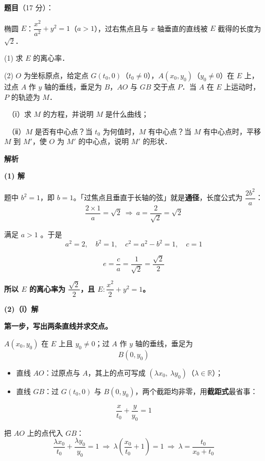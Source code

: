 \begin{answer}

\textbf{题目}（17 分）：

椭圆 $E$：$\dfrac{x^2}{a^2}+y^2=1$（$a>1$），过右焦点且与 $x$ 轴垂直的直线被 $E$ 截得的长度为 $\sqrt{2}$．

  (1) 求 $E$ 的离心率．

  (2) $O$ 为坐标原点，给定点 $G(t_0,0)$（$t_0\ne0$），$A(x_0,y_0)$（$y_0\ne0$）在 $E$ 上，过点 $A$ 作 $y$ 轴的垂线，垂足为 $B$，$AO$ 与 $GB$ 交于点 $P$．当 $A$ 在 $E$ 上运动时，$P$ 的轨迹为 $M$．

  　（ⅰ）求 $M$ 的方程，并说明 $M$ 是什么曲线；

  　（ⅱ）$M$ 是否有中心点？当 $t_0$ 为何值时，$M$ 有中心点？当 $M$ 有中心点时，平移 $M$ 到 $M'$，使 $O$ 为 $M'$ 的中心点，说明 $M'$ 的形状．

\textbf{解析}

\par\medskip

\textbf{(1) 解}

题中 $b^2=1$，即 $b=1$。「过焦点且垂直于长轴的弦」就是\textbf{通径}，长度公式为 $\dfrac{2b^2}{a}$：
\nopagebreak[4]
\[\frac{2\times1}{a}=\sqrt2\ \Longrightarrow\ a=\frac{2}{\sqrt2}=\sqrt2\]

满足 $a>1$ 。于是
\nopagebreak[4]
\[a^2=2,\quad b^2=1,\quad c^2=a^2-b^2=1,\quad c=1\]

\nopagebreak[4]
\[e=\frac{c}{a}=\frac{1}{\sqrt2}=\frac{\sqrt2}{2}\]

\textbf{所以 $E$ 的离心率为 $\dfrac{\sqrt2}{2}$，且 $E:\dfrac{x^2}{2}+y^2=1$。}

\par\medskip

\textbf{(2)（ⅰ）解}

\textbf{第一步，写出两条直线并求交点。}

$A(x_0,y_0)$ 在 $E$ 上且 $y_0\ne0$；过 $A$ 作 $y$ 轴的垂线，垂足为
\nopagebreak[4]
\[B(0,y_0)\]

\begin{itemize}
\item 直线 $AO$：过原点与 $A$，其上的点可写成 $\left(\lambda x_0,\ \lambda y_0\right)$（$\lambda\in\mathbb{R}$）；
\item 直线 $GB$：过 $G(t_0,0)$ 与 $B(0,y_0)$，两个截距均非零，用\textbf{截距式}最省事：
\end{itemize}
\nopagebreak[4]
\[\frac{x}{t_0}+\frac{y}{y_0}=1\]

把 $AO$ 上的点代入 $GB$：
\nopagebreak[4]
\[\frac{\lambda x_0}{t_0}+\frac{\lambda y_0}{y_0}=1\ \Longrightarrow\ \lambda\left(\frac{x_0}{t_0}+1\right)=1\ \Longrightarrow\ \lambda=\frac{t_0}{x_0+t_0}\]


\end{answer}
